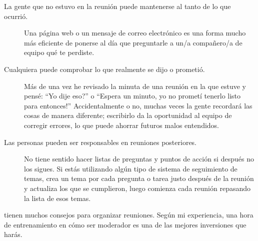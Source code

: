 \begin{description}

\item[La gente que no estuvo en la reunión puede mantenerse al tanto de lo que ocurrió.]
  Una página web o un mensaje de correo electrónico es una forma mucho más eficiente de ponerse al día
  que preguntarle a un/a compañero/a de equipo qué te perdiste.

\item[Cualquiera puede comprobar lo que realmente se dijo o prometió.]
  Más de una vez
  he revisado la minuta de una reunión en la que estuve
  y pensé: ``Yo dije eso?''
  o ``Espera un minuto, yo no prometí tenerlo listo para entonces!''
  Accidentalmente o no,
  muchas veces la gente recordará las cosas de manera diferente;
  escribirlo da la oportunidad al equipo de corregir errores,
  lo que puede ahorrar futuros malos entendidos.

\item[Las personas pueden ser responsables en reuniones posteriores.]
  No tiene sentido hacer listas de preguntas y puntos de acción
  si después no los sigues.
  Si estás utilizando algún tipo de sistema de seguimiento de temas,
  crea un tema por cada pregunta o tarea justo después de la reunión
  y actualiza los que se cumplieron,
  luego comienza cada reunión repasando la lista de esos temas.

\end{description}

\cite{Brow2007,Broo2016,Roge2018} tienen muchos consejos para organizar reuniones.
Según mi experiencia,
una hora de entrenamiento en cómo ser moderador
es una de las mejores inversiones que harás.

